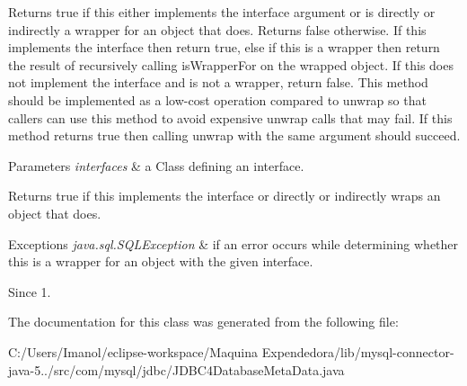 Returns true if this either implements the interface argument or is directly or indirectly a wrapper for an object that does. Returns false otherwise. If this implements the interface then return true, else if this is a wrapper then return the result of recursively calling {\ttfamily is\+Wrapper\+For} on the wrapped object. If this does not implement the interface and is not a wrapper, return false. This method should be implemented as a low-\/cost operation compared to {\ttfamily unwrap} so that callers can use this method to avoid expensive {\ttfamily unwrap} calls that may fail. If this method returns true then calling {\ttfamily unwrap} with the same argument should succeed.


\begin{DoxyParams}{Parameters}
{\em interfaces} & a Class defining an interface. \\
\hline
\end{DoxyParams}
\begin{DoxyReturn}{Returns}
true if this implements the interface or directly or indirectly wraps an object that does. 
\end{DoxyReturn}

\begin{DoxyExceptions}{Exceptions}
{\em java.\+sql.\+S\+Q\+L\+Exception} & if an error occurs while determining whether this is a wrapper for an object with the given interface. \\
\hline
\end{DoxyExceptions}
\begin{DoxySince}{Since}
1. 
\end{DoxySince}


The documentation for this class was generated from the following file\+:\begin{DoxyCompactItemize}
\item 
C\+:/\+Users/\+Imanol/eclipse-\/workspace/\+Maquina Expendedora/lib/mysql-\/connector-\/java-\/5../src/com/mysql/jdbc/J\+D\+B\+C4\+Database\+Meta\+Data.\+java\end{DoxyCompactItemize}
